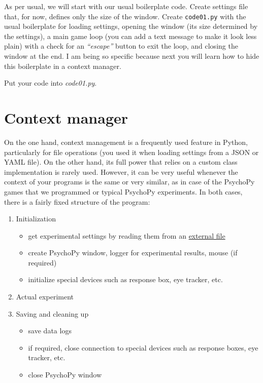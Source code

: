 \documentclass[
]{book}
\providecommand{\tightlist}{%
  \setlength{\itemsep}{0pt}\setlength{\parskip}{0pt}}
\begin{document}
As per usual, we will start with our usual boilerplate code. Create settings file that, for now, defines only the size of the window. Create \texttt{code01.py} with the usual boilerplate for loading settings, opening the window (its size determined by the settings), a main game loop (you can add a text message to make it look less plain) with a check for an \emph{``escape''} button to exit the loop, and closing the window at the end. I am being so specific because next you will learn how to hide this boilerplate in a context manager.

Put your code into \emph{code01.py}.

\hypertarget{context-manager}{%
\section{Context manager}\label{context-manager}}

On the one hand, context management is a frequently used feature in Python, particularly for file operations (you used it when loading settings from a JSON or YAML file). On the other hand, its full power that relies on a custom class implementation is rarely used. However, it can be very useful whenever the context of your programs is the same or very similar, as in case of the PsychoPy games that we programmed or typical PsychoPy experiments. In both cases, there is a fairly fixed structure of the program:

\begin{enumerate}
\def\labelenumi{\arabic{enumi}.}
\tightlist
\item
  Initialization

  \begin{itemize}
  \tightlist
  \item
    get experimental settings by reading them from an \protect\hyperlink{settings-files}{external file}
  \item
    create PsychoPy window, logger for experimental results, mouse (if required)
  \item
    initialize special devices such as response box, eye tracker, etc.
  \end{itemize}
\item
  Actual experiment
\item
  Saving and cleaning up

  \begin{itemize}
  \tightlist
  \item
    save data logs
  \item
    if required, close connection to special devices such as response boxes, eye tracker, etc.
  \item
    close PsychoPy window
  \end{itemize}
\end{enumerate}
\end{document}
